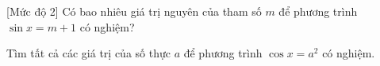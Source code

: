 \begin{bt}%
[Mức độ 2]%
	Có bao nhiêu giá trị nguyên của tham số $m$ để phương trình $\sin x=m+1$ có nghiệm?
\end{bt}

\begin{bt}%
	Tìm tất cả các giá trị của số thực $a$ để phương trình $\cos x = a^2$ có nghiệm.
\end{bt}

